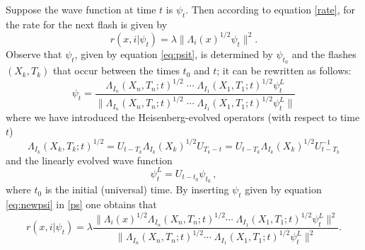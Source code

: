 \documentclass[12pt]{article}
\begin{document}
Suppose the wave function at time $t$ is $\psi_t$. Then according to equation \eqref{rate}, for {} the rate for the next flash is given by 
\begin{equation}
r(x,i|\psi_t)=\lambda  
  \|\Lambda_i (x)^{1/2}\psi_{t}\|^2 .
  \label{ps}
\end{equation}
Observe that $\psi_t$, given by equation \eqref{eq:psit}, is determined by $\psi_{t_0}$ and the flashes $(X_k,T_k)$ that occur between the times $t_0$ and $t$; it 
can be rewritten as follows:
\begin{equation}\label{eq:newpsi}
  \psi_t =  %
  \frac{ \Lambda_{I_n}(X_n,T_n;t)^{1/2} \;  \cdots\;   
  \Lambda_{I_1}(X_1,T_1;t)^{1/2}  \psi_{t}^L}
  {\|  \Lambda_{I_n}(X_n,T_n;t)^{1/2} \;  \cdots\;   
  \Lambda_{I_1}(X_1,T_1;t)^{1/2}  \psi_{t}^L\|}
\end{equation}
where we have introduced the  Heisenberg-evolved operators (with respect to time $t$)
\begin{equation}\Lambda_{I_k}(X_k,T_k;t)^{1/2} =  
U_{t-T_k} \Lambda_{I_k}(X_k)^{1/2} U_{T_k-t} = 
U_{t-T_k} \Lambda_{I_k}(X_k)^{1/2} U_{t-T_k}^{-1}
\end{equation}
and the linearly evolved wave function
\begin{equation}
  \psi_{t}^L= U_{t-t_0}\psi_{t_0}\, ,
\end{equation}     
where $t_0$ is the initial (universal) time.
By inserting $\psi_t$ given by equation \eqref{eq:newpsi} in \eqref{ps} one obtains that 
\begin{equation}
r(x,i|\psi_t)=\lambda \frac{  \| \Lambda_i (x)^{1/2}\Lambda_{I_n}(X_n,T_n;t)^{1/2} 
  \cdots\;   \Lambda_{I_1}(X_1,T_1;t)^{1/2}  \psi_{t}^L
\|^2}{\|   \Lambda_{I_n}(X_n,T_n;t)^{1/2} 
  \cdots\;   \Lambda_{I_1}(X_1,T_1;t)^{1/2}  \psi_{t}^L
  \|^2}.
\label{eq:newpsip}
\end{equation}
\end{document}
